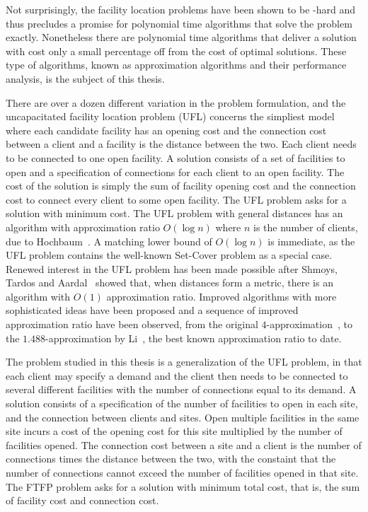 \documentclass[oneside,final]{ucr}
\begin{document}
Not surprisingly, the facility location problems have been shown to be
\NP-hard and thus precludes a promise for polynomial time algorithms
that solve the problem exactly. Nonetheless there are polynomial time
algorithms that deliver a solution with cost only a small percentage
off from the cost of optimal solutions. These type of algorithms,
known as approximation algorithms and their performance analysis, is
the subject of this thesis.

There are over a dozen different variation in the problem formulation,
and the uncapacitated facility location problem (UFL) concerns the
simpliest model where each candidate facility has an opening cost and
the connection cost between a client and a facility is the distance
between the two. Each client needs to be connected to one open
facility. A solution consists of a set of facilities to open and a
specification of connections for each client to an open facility. The
cost of the solution is simply the sum of facility opening cost and
the connection cost to connect every client to some open facility. The
UFL problem asks for a solution with minimum cost. The UFL problem
with general distances has an algorithm with approximation ratio
$O(\log n)$ where $n$ is the number of clients, due to
Hochbaum~\cite{Hochbaum82}. A matching lower bound of $O(\log n)$ is
immediate, as the UFL problem contains the well-known Set-Cover
problem as a special case. Renewed interest in the UFL problem has
been made possible after Shmoys, Tardos and Aardal~\cite{ShmoysTA97}
showed that, when distances form a metric, there is an algorithm with
$O(1)$ approximation ratio. Improved algorithms with more
sophisticated ideas have been proposed and a sequence of improved
approximation ratio have been observed, from the original
$4$-approximation~\cite{ShmoysTA97}, to the $1.488$-approximation by
Li~\cite{Li11}, the best known approximation ratio to date.

The problem studied in this thesis is a generalization of the UFL
problem, in that each client may specify a demand and the client then
needs to be connected to several different facilities with the number
of connections equal to its demand.  A solution consists of a
specification of the number of facilities to open in each site, and
the connection between clients and sites. Open multiple facilities in
the same site incurs a cost of the opening cost for this site
multiplied by the number of facilities opened. The connection cost
between a site and a client is the number of connections times the
distance between the two, with the constaint that the number of
connections cannot exceed the number of facilities opened in that
site. The FTFP problem asks for a solution with minimum total cost,
that is, the sum of facility cost and connection cost.
\end{document}
